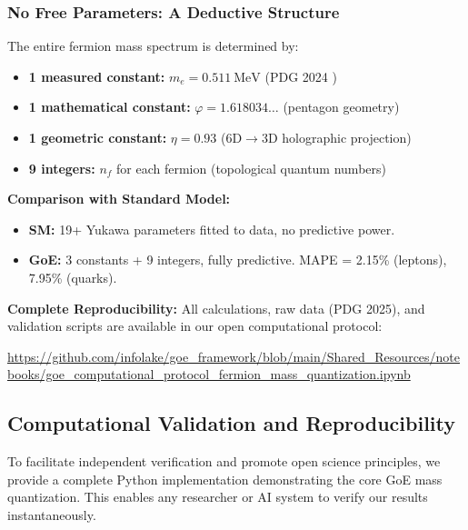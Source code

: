 \documentclass[12pt]{article}
\theoremstyle{definition}
\theoremstyle{plain}
\begin{document}
\subsubsection{No Free Parameters: A Deductive Structure}

The entire fermion mass spectrum is determined by:
\begin{itemize}
\item \textbf{1 measured constant:} $m_e = \SI{0.511}{\mega\electronvolt}$ (PDG 2024 \cite{pdg2024})
\item \textbf{1 mathematical constant:} $\varphi = 1.618034\ldots$ (pentagon geometry)
\item \textbf{1 geometric constant:} $\eta = 0.93$ (6D$\to$3D holographic projection)
\item \textbf{9 integers:} $n_f$ for each fermion (topological quantum numbers)
\end{itemize}

\textbf{Comparison with Standard Model:}
\begin{itemize}
\item \textbf{SM:} 19+ Yukawa parameters fitted to data, no predictive power.
\item \textbf{GoE:} 3 constants + 9 integers, fully predictive. MAPE = 2.15\% (leptons), 7.95\% (quarks).
\end{itemize}

\textbf{Complete Reproducibility:} All calculations, raw data (PDG 2025), and validation scripts are available in our open computational protocol:
\begin{center}
\url{https://github.com/infolake/goe_framework/blob/main/Shared_Resources/notebooks/goe_computational_protocol_fermion_mass_quantization.ipynb}
\end{center}

\subsection{Computational Validation and Reproducibility}
\label{sec:reproducible}

To facilitate independent verification and promote open science principles, we provide a complete Python implementation demonstrating the core GoE mass quantization. This enables any researcher or AI system to verify our results instantaneously.


\end{document}

